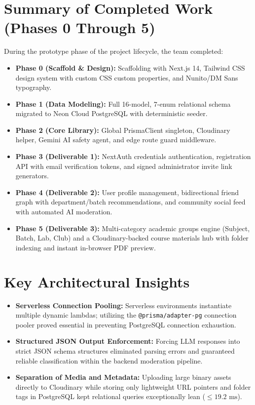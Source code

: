 \documentclass[12pt, a4paper, oneside]{report}
\begin{document}
\section{Summary of Completed Work (Phases 0 Through 5)}
During the prototype phase of the project lifecycle, the team completed:
\begin{itemize}[leftmargin=0.7cm]
    \item \textbf{Phase 0 (Scaffold \& Design):} Scaffolding with Next.js 14, Tailwind CSS design system with custom CSS custom properties, and Nunito/DM Sans typography.
    \item \textbf{Phase 1 (Data Modeling):} Full 16-model, 7-enum relational schema migrated to Neon Cloud PostgreSQL with deterministic seeder.
    \item \textbf{Phase 2 (Core Library):} Global PrismaClient singleton, Cloudinary helper, Gemini AI safety agent, and edge route guard middleware.
    \item \textbf{Phase 3 (Deliverable 1):} NextAuth credentials authentication, registration API with email verification tokens, and signed administrator invite link generators.
    \item \textbf{Phase 4 (Deliverable 2):} User profile management, bidirectional friend graph with department/batch recommendations, and community social feed with automated AI moderation.
    \item \textbf{Phase 5 (Deliverable 3):} Multi-category academic groups engine (Subject, Batch, Lab, Club) and a Cloudinary-backed course materials hub with folder indexing and instant in-browser PDF preview.
\end{itemize}

\section{Key Architectural Insights}
\begin{itemize}[leftmargin=0.7cm]
    \item \textbf{Serverless Connection Pooling:} Serverless environments instantiate multiple dynamic lambdas; utilizing the \texttt{@prisma/adapter-pg} connection pooler proved essential in preventing PostgreSQL connection exhaustion.
    \item \textbf{Structured JSON Output Enforcement:} Forcing LLM responses into strict JSON schema structures eliminated parsing errors and guaranteed reliable classification within the backend moderation pipeline.
    \item \textbf{Separation of Media and Metadata:} Uploading large binary assets directly to Cloudinary while storing only lightweight URL pointers and folder tags in PostgreSQL kept relational queries exceptionally lean ($\le 19.2\text{ ms}$).
\end{itemize}
\end{document}
